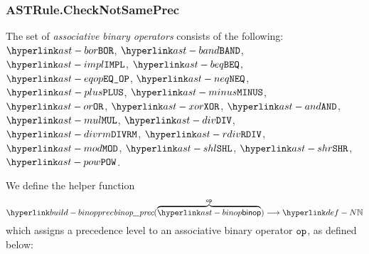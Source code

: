 \begin{mathpar}
\end{mathpar}

\subsubsection{ASTRule.CheckNotSamePrec\label{sec:ASTRule.CheckNotSamePrec}}
The set of \emph{associative binary operators} consists of the following:
$\BOR$,
$\BAND$,
$\IMPL$,
$\BEQ$,
$\EQOP$,
$\NEQ$,
$\PLUS$,
$\MINUS$,
$\OR$,
$\XOR$,
$\AND$,
$\MUL$,
$\DIV$,
$\DIVRM$,
$\RDIV$,
$\MOD$,
$\SHL$,
$\SHR$,
$\POW$.

\hypertarget{build-binopprec}{}
We define the helper function
\[
  \binopprec(\overname{\binop}{\op}) \aslto \N
\]
which assigns a precedence level to an associative binary operator $\op$,
as defined below:
\begin{mathpar}
\end{mathpar}

